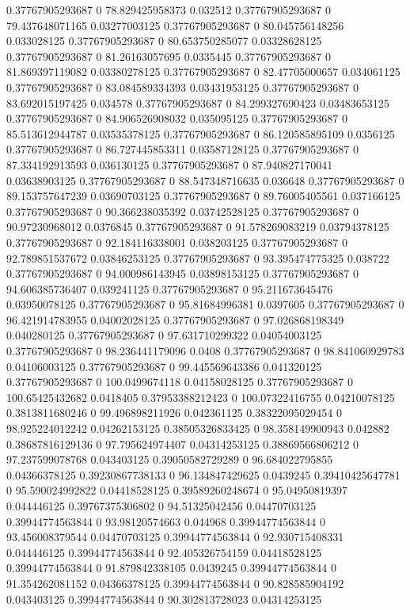 0.37767905293687 0 78.829425958373 0.032512
0.37767905293687 0 79.437648071165 0.03277003125
0.37767905293687 0 80.045756148256 0.033028125
0.37767905293687 0 80.653750285077 0.03328628125
0.37767905293687 0 81.26163057695 0.0335445
0.37767905293687 0 81.869397119082 0.03380278125
0.37767905293687 0 82.47705000657 0.034061125
0.37767905293687 0 83.084589334393 0.03431953125
0.37767905293687 0 83.692015197425 0.034578
0.37767905293687 0 84.299327690423 0.03483653125
0.37767905293687 0 84.906526908032 0.035095125
0.37767905293687 0 85.513612944787 0.03535378125
0.37767905293687 0 86.120585895109 0.0356125
0.37767905293687 0 86.727445853311 0.03587128125
0.37767905293687 0 87.334192913593 0.036130125
0.37767905293687 0 87.940827170041 0.03638903125
0.37767905293687 0 88.547348716635 0.036648
0.37767905293687 0 89.153757647239 0.03690703125
0.37767905293687 0 89.76005405561 0.037166125
0.37767905293687 0 90.366238035392 0.03742528125
0.37767905293687 0 90.97230968012 0.0376845
0.37767905293687 0 91.578269083219 0.03794378125
0.37767905293687 0 92.184116338001 0.038203125
0.37767905293687 0 92.789851537672 0.03846253125
0.37767905293687 0 93.395474775325 0.038722
0.37767905293687 0 94.000986143945 0.03898153125
0.37767905293687 0 94.606385736407 0.039241125
0.37767905293687 0 95.211673645476 0.03950078125
0.37767905293687 0 95.81684996381 0.0397605
0.37767905293687 0 96.421914783955 0.04002028125
0.37767905293687 0 97.026868198349 0.040280125
0.37767905293687 0 97.631710299322 0.04054003125
0.37767905293687 0 98.236441179096 0.0408
0.37767905293687 0 98.841060929783 0.04106003125
0.37767905293687 0 99.445569643386 0.041320125
0.37767905293687 0 100.0499674118 0.04158028125
0.37767905293687 0 100.65425432682 0.0418405
0.37953388212423 0 100.07322416755 0.04210078125
0.3813811680246 0 99.496898211926 0.042361125
0.38322095029454 0 98.925224012242 0.04262153125
0.38505326833425 0 98.358149900943 0.042882
0.38687816129136 0 97.795624974407 0.04314253125
0.38869566806212 0 97.237599078768 0.043403125
0.39050582729289 0 96.684022795855 0.04366378125
0.39230867738133 0 96.134847429625 0.0439245
0.39410425647781 0 95.590024992822 0.04418528125
0.39589260248674 0 95.04950819397 0.044446125
0.39767375306802 0 94.51325042456 0.04470703125
0.39944774563844 0 93.98120574663 0.044968
0.39944774563844 0 93.456008379544 0.04470703125
0.39944774563844 0 92.930715408331 0.044446125
0.39944774563844 0 92.405326754159 0.04418528125
0.39944774563844 0 91.879842338105 0.0439245
0.39944774563844 0 91.354262081152 0.04366378125
0.39944774563844 0 90.828585904192 0.043403125
0.39944774563844 0 90.302813728023 0.04314253125
